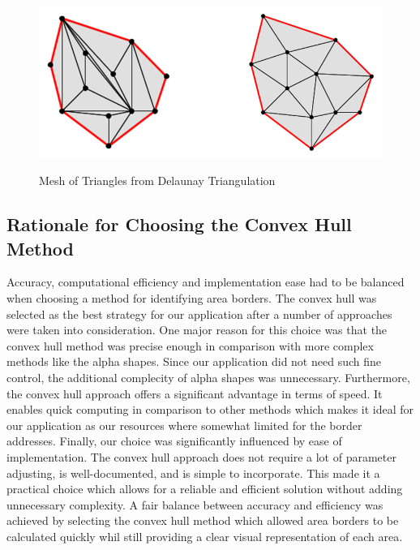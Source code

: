     \begin{figure} [H]
        \centering
        \includegraphics [width=.75\textwidth] {images/andreas/areaBorders/dtPic.png}
        \caption{Mesh of Triangles from Delaunay Triangulation}
        \cite{Andi:dtPic}
    \end{figure}

    \subsection{Rationale for Choosing the Convex Hull Method}
    Accuracy, computational efficiency and implementation ease had to be balanced when choosing a method for identifying area borders. The convex hull was selected as the best strategy for our application after a number of approaches were taken into consideration. \newline
    One major reason for this choice was that the convex hull method was precise enough in comparison with more complex methods like the alpha shapes. Since our application did not need such fine control, the additional complecity of alpha shapes was unnecessary. \newline
    Furthermore, the convex hull approach offers a significant advantage in terms of speed. It enables quick computing in comparison to other methods which makes it ideal for our application as our resources where somewhat limited for the border addresses. \newline
    Finally, our choice was significantly influenced by ease of implementation. The convex hull approach does not require a lot of parameter adjusting, is well-documented, and is simple to incorporate. This made it a practical choice which allows for a reliable and efficient solution without adding unnecessary complexity. \newline
    A fair balance between accuracy and efficiency was achieved by selecting the convex hull method which allowed area borders to be calculated quickly whil still providing a clear visual representation of each area.


